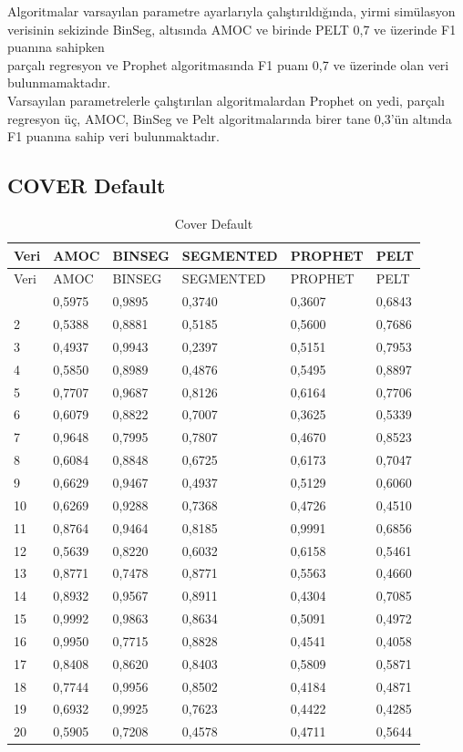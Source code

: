 \documentclass[12pt,twoside]{deuthesis}
\begin{document}
Algoritmalar varsayılan parametre ayarlarıyla çalıştırıldığında, yirmi simülasyon verisinin sekizinde BinSeg, altısında AMOC ve birinde PELT 0,7 ve üzerinde F1 puanına sahipken\\
parçalı regresyon ve Prophet algoritmasında F1 puanı 0,7 ve üzerinde olan veri bulunmamaktadır.\\
Varsayılan parametrelerle çalıştırılan algoritmalardan Prophet on yedi, parçalı regresyon üç, AMOC, BinSeg ve Pelt algoritmalarında birer tane 0,3'ün altında F1 puanına sahip veri bulunmaktadır.

\hypertarget{cover-default-1}{%
\subsection{COVER Default}\label{cover-default-1}}

\begin{longtable}[]{@{}llllll@{}}
\caption{\label{tab:nvar8} Cover Default}\tabularnewline
\toprule\noalign{}
Veri & AMOC & BINSEG & SEGMENTED & PROPHET & PELT \\
\midrule\noalign{}
\endfirsthead
\toprule\noalign{}
Veri & AMOC & BINSEG & SEGMENTED & PROPHET & PELT \\
\midrule\noalign{}
\endhead
\bottomrule\noalign{}
\endlastfoot
1 & 0,5975 & 0,9895 & 0,3740 & 0,3607 & 0,6843 \\
2 & 0,5388 & 0,8881 & 0,5185 & 0,5600 & 0,7686 \\
3 & 0,4937 & 0,9943 & 0,2397 & 0,5151 & 0,7953 \\
4 & 0,5850 & 0,8989 & 0,4876 & 0,5495 & 0,8897 \\
5 & 0,7707 & 0,9687 & 0,8126 & 0,6164 & 0,7706 \\
6 & 0,6079 & 0,8822 & 0,7007 & 0,3625 & 0,5339 \\
7 & 0,9648 & 0,7995 & 0,7807 & 0,4670 & 0,8523 \\
8 & 0,6084 & 0,8848 & 0,6725 & 0,6173 & 0,7047 \\
9 & 0,6629 & 0,9467 & 0,4937 & 0,5129 & 0,6060 \\
10 & 0,6269 & 0,9288 & 0,7368 & 0,4726 & 0,4510 \\
11 & 0,8764 & 0,9464 & 0,8185 & 0,9991 & 0,6856 \\
12 & 0,5639 & 0,8220 & 0,6032 & 0,6158 & 0,5461 \\
13 & 0,8771 & 0,7478 & 0,8771 & 0,5563 & 0,4660 \\
14 & 0,8932 & 0,9567 & 0,8911 & 0,4304 & 0,7085 \\
15 & 0,9992 & 0,9863 & 0,8634 & 0,5091 & 0,4972 \\
16 & 0,9950 & 0,7715 & 0,8828 & 0,4541 & 0,4058 \\
17 & 0,8408 & 0,8620 & 0,8403 & 0,5809 & 0,5871 \\
18 & 0,7744 & 0,9956 & 0,8502 & 0,4184 & 0,4871 \\
19 & 0,6932 & 0,9925 & 0,7623 & 0,4422 & 0,4285 \\
20 & 0,5905 & 0,7208 & 0,4578 & 0,4711 & 0,5644 \\
\end{longtable}
\end{document}
